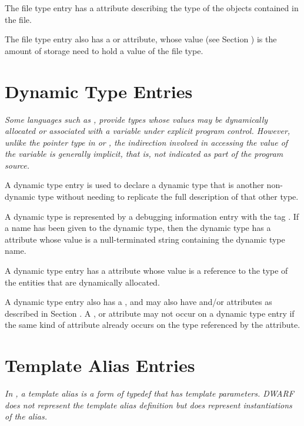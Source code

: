 {The file type entry has 
a \DWATtype{} attribute describing
the type of the objects contained in the file.

The file type entry also has a 
\DWATbytesize{} or
\DWATbitsize{} attribute, whose value 
(see Section )
is the amount of storage need to hold a value of the file type.

\section{Dynamic Type Entries}
\label{chap:dynamictypeentries}
\textit{Some languages such as 
, provide types whose values
may be dynamically allocated or associated with a variable
under explicit program control. However, unlike the
pointer type in  or 
, the indirection involved in accessing
the value of the variable is generally implicit, that is, not
indicated as part of the program source.}

A dynamic type entry is used to declare a dynamic type that is 
 another non-dynamic type without needing to
replicate the full description of that other type.

A dynamic type is represented by a debugging information entry
with the tag \DWTAGdynamictypeTARG. If a name has been given to the
dynamic type, then the dynamic type has a \DWATname{} attribute 
whose value is a null-terminated string containing the dynamic
type name.
	
A dynamic type entry has a \DWATtype{} attribute whose value is a
reference to the type of the entities that are dynamically allocated.
	
A dynamic type entry also has a \DWATdatalocation, and may also
have \DWATallocated{} and/or \DWATassociated{} attributes as 
described in Section . 
A \DWATdatalocation, \DWATallocated{} or \DWATassociated{} attribute 
may not occur on a dynamic type entry if the same kind of attribute 
already occurs on the type referenced by the \DWATtype{} attribute.


\section{Template Alias Entries}
\label{chap:templatealiasentries}

\textit{In , a template alias is a form of typedef that has template
parameters.  DWARF does not represent the template alias definition
but does represent instantiations of the alias.}

}
